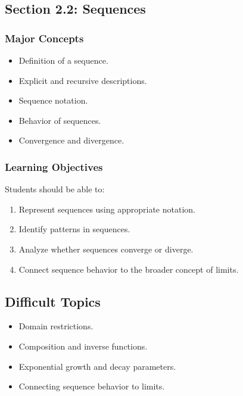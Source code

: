 \documentclass[11pt]{article}
\begin{document}
\subsection{Section 2.2: Sequences}

\subsubsection{Major Concepts}

\begin{itemize}
    \item Definition of a sequence.
    \item Explicit and recursive descriptions.
    \item Sequence notation.
    \item Behavior of sequences.
    \item Convergence and divergence.
\end{itemize}

\subsubsection{Learning Objectives}

Students should be able to:

\begin{enumerate}
    \item Represent sequences using appropriate notation.
    \item Identify patterns in sequences.
    \item Analyze whether sequences converge or diverge.
    \item Connect sequence behavior to the broader concept of limits.
\end{enumerate}

\subsection{Difficult Topics}

\begin{itemize}
    \item Domain restrictions.
    \item Composition and inverse functions.
    \item Exponential growth and decay parameters.
    \item Connecting sequence behavior to limits.
\end{itemize}

\end{document}
